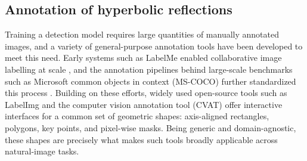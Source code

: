 \documentclass[lettersize,journal]{IEEEtran}
\begin{document}


\subsection{Annotation of hyperbolic reflections}
Training a detection model requires large quantities of manually annotated
images, and a variety of general-purpose annotation tools have been developed to
meet this need. Early systems such as LabelMe enabled collaborative image
labelling at scale \cite{russell2008labelme}, and the annotation pipelines
behind large-scale benchmarks such as Microsoft common objects in context
(MS-COCO) further standardized this process \cite{lin2014coco}. Building on
these efforts, widely used open-source tools such as LabelImg
\cite{tzutalin2015labelimg} and the computer vision annotation tool (CVAT)
\cite{cvat} offer interactive interfaces for a common set of geometric shapes:
axis-aligned rectangles, polygons, key points, and pixel-wise masks. Being
generic and domain-agnostic, these shapes are precisely what makes such tools
broadly applicable across natural-image tasks.
\end{document}

